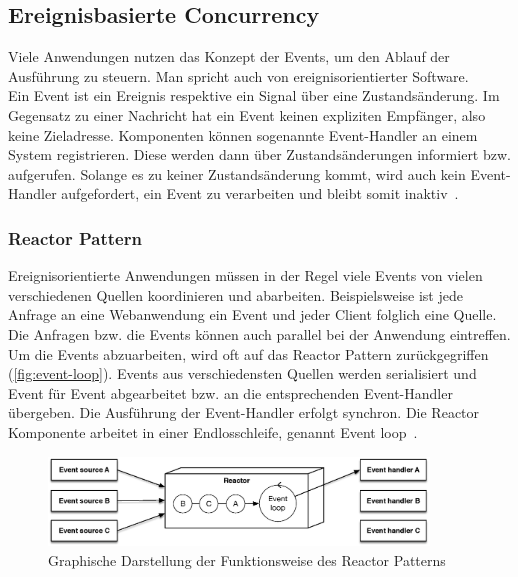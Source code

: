 \pagebreak

\subsection{Ereignisbasierte Concurrency}\label{subsec:eventdriven-concurrency}
Viele Anwendungen nutzen das Konzept der Events, um den Ablauf der Ausführung zu steuern. Man spricht auch von ereignisorientierter Software.\\ 
Ein Event ist ein Ereignis respektive ein Signal über eine Zustandsänderung. Im Gegensatz zu einer Nachricht hat ein Event keinen expliziten Empfänger, also keine Zieladresse. Komponenten können sogenannte Event-Handler an einem System registrieren. Diese werden dann über Zustandsänderungen informiert bzw. aufgerufen. Solange es zu keiner Zustandsänderung kommt, wird auch kein Event-Handler aufgefordert, ein Event zu verarbeiten und bleibt somit inaktiv~\cite[S.~91]{erb_concurrent_2012}.

\subsubsection{Reactor Pattern}
Ereignisorientierte Anwendungen müssen in der Regel viele Events von vielen verschiedenen Quellen koordinieren und abarbeiten. Beispielsweise ist jede Anfrage an eine Webanwendung ein Event und jeder Client folglich eine Quelle. Die Anfragen bzw. die Events können auch parallel bei der Anwendung eintreffen.\\
Um die Events abzuarbeiten, wird oft auf das Reactor Pattern zurückgegriffen (\autoref{fig:event-loop}). Events aus verschiedensten Quellen werden serialisiert und Event für Event abgearbeitet bzw. an die entsprechenden Event-Handler übergeben. Die Ausführung der Event-Handler erfolgt synchron. Die Reactor Komponente arbeitet in einer Endlosschleife, genannt Event loop~\cite[S.~260~-~S.~261]{buschmann_pattern_2011}.

\begin{figure}[H]
 \centering
 \includegraphics[width=0.9\textwidth]{4-Hauptteil/event-loop/event-loop.eps}
 \caption{Graphische Darstellung der Funktionsweise des Reactor Patterns}
 \label{fig:event-loop}
\end{figure}

